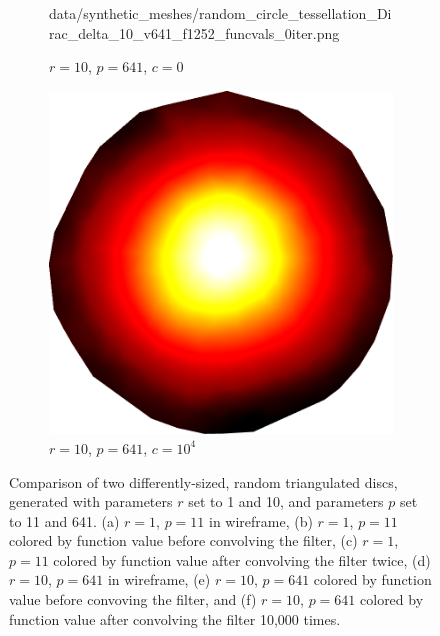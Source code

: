 \begin{figure}[ht]
\begin{subfigure}[b]{0.32\linewidth}
		{data/synthetic_meshes/random_circle_tessellation_Dirac_delta_10_v641_f1252_funcvals_0iter.png}
		\caption{$r=10$, $p=641$, $c=0$}\label{fig:rcirc.d}
	\end{subfigure}
	\begin{subfigure}[b]{0.32\linewidth}
		\includegraphics[width=\linewidth]
		{data/synthetic_meshes/random_circle_tessellation_Dirac_delta_10_v641_f1252_funcvals_10000iter.png}
		\caption{$r=10$, $p=641$, $c=10^4$}\label{fig:rcirc.f}
	\end{subfigure}
	\caption[Six Views Comparing Random Triangulated Discs]{Comparison of two differently-sized, random triangulated discs, generated with parameters $r$ set to 1 and 10, and parameters $p$ set to 11 and 641. (a) $r=1$, $p=11$ in wireframe, (b) $r=1$, $p=11$ colored by function value before convolving the filter, (c) $r=1$, $p=11$ colored by function value after convolving the filter twice, (d) $r=10$, $p=641$ in wireframe, (e) $r=10$, $p=641$ colored by function value before convoving the filter, and (f) $r=10$, $p=641$ colored by function value after convolving the filter 10,000 times.}
	\label{fig:rdisc}
\end{figure}


